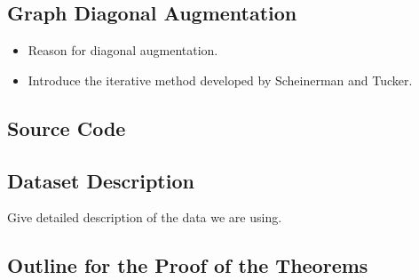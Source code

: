 \documentclass[a4paper]{article}
\begin{document}
\subsection{Graph Diagonal Augmentation}
\begin{itemize}
\item Reason for diagonal augmentation.
\item Introduce the iterative method developed by Scheinerman and Tucker.
\end{itemize}

\subsection{Source Code}

\subsection{Dataset Description}
Give detailed description of the data we are using.

\subsection{Outline for the Proof of the Theorems}
\end{document}
